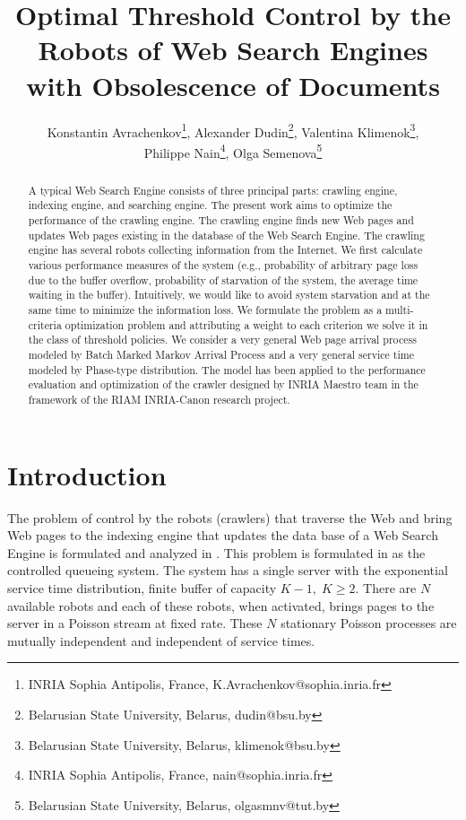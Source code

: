 \documentclass[11pt]{article}
\begin{document}
\title{Optimal Threshold Control by the Robots of Web Search Engines with Obsolescence of Documents}

\author{Konstantin Avrachenkov\thanks{INRIA Sophia Antipolis, France, K.Avrachenkov@sophia.inria.fr},
Alexander Dudin\thanks{Belarusian State University, Belarus, dudin@bsu.by},
Valentina Klimenok\thanks{Belarusian State University, Belarus, klimenok@bsu.by},\\
Philippe Nain\thanks{INRIA Sophia Antipolis, France, nain@sophia.inria.fr},
Olga Semenova\thanks{Belarusian State University, Belarus, olgasmnv@tut.by}
}


\date{}

\maketitle

\begin{abstract}
A typical Web Search Engine consists of three principal parts: crawling engine,
indexing engine, and searching engine. The present work aims to optimize the
performance of the crawling engine. The crawling engine finds new Web pages and
updates Web pages existing in the database of the Web Search Engine. The crawling
engine has several robots collecting information from the Internet. We first
calculate various performance measures of the system (e.g., probability of
arbitrary page loss due to the buffer overflow, probability of starvation of
the system, the average time waiting in the buffer). Intuitively, we would like
to avoid system starvation and at the same time to minimize the information loss.
We formulate the problem as a multi-criteria optimization problem and attributing
a weight to each criterion we solve it in the class of threshold policies.
We consider a very general Web page arrival process modeled by Batch Marked
Markov Arrival Process and a very general service time modeled by Phase-type
distribution. The model has been applied to the performance evaluation and
optimization of the crawler designed by INRIA Maestro team in the framework
of the RIAM INRIA-Canon research project.
\end{abstract}






\section{Introduction}
The problem of control by the robots (crawlers) that traverse the Web
and bring Web pages to the indexing engine that updates the data
base of a Web Search Engine is formulated and analyzed in
\cite{tlnc}. This problem is formulated in \cite{tlnc} as the
controlled queueing system. The system has a single server with the
exponential service time distribution, finite buffer of capacity
$K-1, \; K \ge 2.$ There are $N$ available robots and each of these
robots, when activated, brings pages to the server in a Poisson
stream at fixed rate.  These $N$ stationary Poisson processes are
mutually independent and independent of service times.
\end{document}
